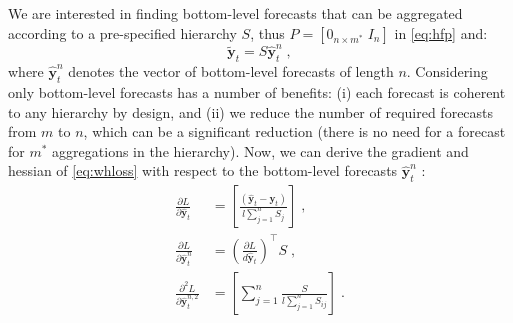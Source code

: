\documentclass[preprint, 3p, times, twocolumn]{elsarticle}
\begin{document}
We are interested in finding bottom-level forecasts that can be aggregated according to a pre-specified hierarchy \(S\), thus \(P = [0_{n \times m^*} \; I_n] \) in \eqref{eq:hfp} and:
\begin{equation} \label{eq:hfpbu}
  \tilde{\textbf{y}}_{t} = S \hat{\textbf{y}}^n_{t} \;,
\end{equation}
where \(\hat{\textbf{y}}^n_{t}\) denotes the vector of bottom-level forecasts of length \(n\). 
Considering only bottom-level forecasts has a number of benefits: (i) each forecast is coherent to any hierarchy by design, and (ii) we reduce the number of required forecasts from \(m\) to \(n\), which can be a significant reduction (there is no need for a forecast for \(m^*\) aggregations in the hierarchy). 
Now, we can derive the gradient and hessian of \eqref{eq:whloss} with respect to the bottom-level forecasts \(\hat{\textbf{y}}^n_{t}\) : 
\begin{align} 
  \frac{\partial L}{\partial \hat{\textbf{y}}_{t}} &=  \left[ \frac{(\hat{\textbf{y}}_{t} - \textbf{y}_{t})}{l \sum_{j=1}^n S_{j}} \right] \;, \label{eq:hfp_grad} \\
  \frac{\partial L}{\partial \hat{\textbf{y}}^n_{t}} &= \left(\frac{\partial L}{d \hat{\textbf{y}}_{t}}\right)^\intercal S \;, \label{eq:hfpbu_grad}  \\
  \frac{\partial^2 L}{\partial \hat{\textbf{y}}_{t}^{n, 2}} &= \left[ \sum_{j=1}^n \frac{S}{l \sum_{j=1}^n S_{ij}} \right]\;. \label{eq:hfpbu_hess}                                               
\end{align}
\end{document}
